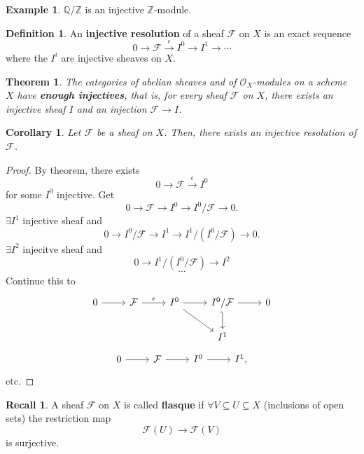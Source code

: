 \documentclass[12pt]{article}
\newtheorem*{theorem}{Theorem}
\newtheorem*{corollary}{Corollary}
\theoremstyle{definition}
\newtheorem*{definition}{Definition}
\newtheorem*{recall}{Recall}
\newtheorem*{example}{Example}
\theoremstyle{remark}
\begin{document}
\begin{example}
$\mathbb{Q}/\mathbb{Z}$ is an injective $\mathbb{Z}$-module.
\end{example}

\begin{definition}
An \textbf{injective resolution} of a sheaf $\mathcal{F}$ on $X$ is an exact sequence
\[0\longrightarrow\mathcal{F}\overset{\epsilon}{\longrightarrow}I^0\longrightarrow I^1\longrightarrow\cdots\]
where the $I^i$ are injective sheaves on $X$.
\end{definition}

\begin{theorem}
The categories of abelian sheaves and of $\mathcal{O}_X$-modules on a scheme $X$ have \textbf{enough injectives}, that is, for every sheaf $\mathcal{F}$ on $X$, there exists an injective sheaf $I$ and an injection $\mathcal{F}\rightarrow I$.
\end{theorem}

\begin{corollary}
Let $\mathcal{F}$ be a sheaf on $X$. Then, there exists an injective resolution of $\mathcal{F}$.
\end{corollary}

\begin{proof}
By theorem, there exists
\[0\longrightarrow\mathcal{F}\overset{\epsilon}{\longrightarrow}I^0\]
for some $I^0$ injective. Get
\[0\longrightarrow\mathcal{F}\longrightarrow I^0\longrightarrow I^0/\mathcal{F}\longrightarrow0.\]
$\exists I^1$ injective sheaf and
\[0\longrightarrow I^0/\mathcal{F}\longrightarrow I^1\longrightarrow I^1/(I^0/\mathcal{F})\longrightarrow0.\]
$\exists I^2$ injecitve sheaf and
\[0\longrightarrow I^1/(I^0/\mathcal{F})\longrightarrow I^2\]
\[\cdots\]
Continue this to
\[
\begin{tikzcd}
0\arrow[r]&\mathcal{F}\arrow[r,"\epsilon"]&I^0\arrow[r]\arrow[rd]&I^0/\mathcal{F}\arrow[r]\arrow[d,hook']&0\\
&&&I^1
\end{tikzcd}
\]
\[
\begin{tikzcd}
0\arrow[r]&\mathcal{F}\arrow[r]&I^0\arrow[r]&I^1,
\end{tikzcd}
\]
etc.
\end{proof}

\begin{recall}
A sheaf $\mathcal{F}$ on $X$ is called \textbf{flasque} if $\forall V\subseteq U\subseteq X$ (inclusions of open sets) the restriction map
\[\mathcal{F}(U)\longrightarrow\mathcal{F}(V)\]
is surjective.
\end{recall}
\end{document}
